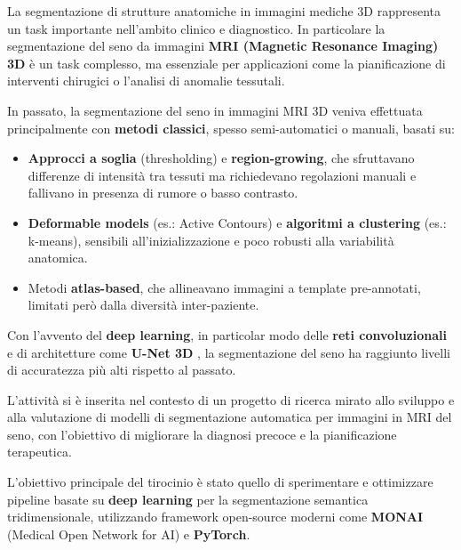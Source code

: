 
La segmentazione di strutture anatomiche in immagini mediche 3D rappresenta un task importante nell’ambito clinico e diagnostico. In particolare la segmentazione del seno da immagini \textbf{MRI (Magnetic Resonance Imaging) 3D} è un task complesso, ma essenziale per applicazioni come la pianificazione di interventi chirugici o l’analisi di anomalie tessutali.

In passato, la segmentazione del seno in immagini MRI 3D veniva effettuata principalmente con \textbf{metodi classici}, spesso semi-automatici o manuali, basati su:

\begin{itemize}
	\item \textbf{Approcci a soglia} (thresholding) e \textbf{region-growing}, che sfruttavano differenze di intensità tra tessuti ma richiedevano regolazioni manuali e fallivano in presenza di rumore o basso contrasto.
	\item \textbf{Deformable models} (es.: Active Contours) e \textbf{algoritmi a clustering} (es.: k-means), sensibili all’inizializzazione e poco robusti alla variabilità anatomica.
	\item Metodi \textbf{atlas-based}, che allineavano immagini a template pre-annotati, limitati però dalla diversità inter-paziente.
\end{itemize}

Con l’avvento del \textbf{deep learning}, in particolar modo delle \textbf{reti convoluzionali} e di architetture come \textbf{U-Net 3D} \cite{chen2021transunet}, la segmentazione del seno ha raggiunto livelli di accuratezza più alti rispetto al passato. 





L’attività si è inserita nel contesto di un progetto di ricerca mirato allo sviluppo e alla valutazione di modelli di segmentazione automatica per immagini in MRI del seno, con l’obiettivo di migliorare la diagnosi precoce e la pianificazione terapeutica.

L’obiettivo principale del tirocinio è stato quello di sperimentare e ottimizzare pipeline basate su \textbf{deep learning} per la segmentazione semantica tridimensionale, utilizzando framework open-source moderni come \textbf{MONAI} (Medical Open Network for AI) \cite{cardoso2022monai} e \textbf{PyTorch}.

